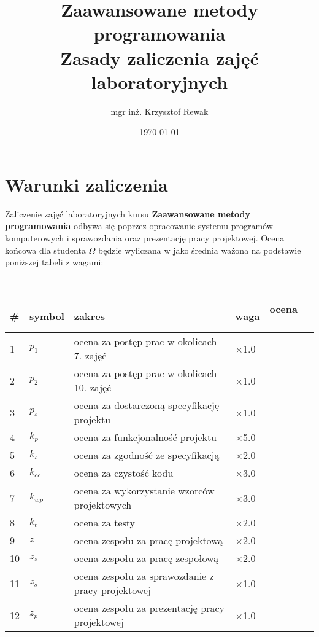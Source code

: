\documentclass{article}
\title{
	Zaawansowane metody programowania\\
	\Huge{Zasady zaliczenia zajęć laboratoryjnych}
}
\author{mgr inż. Krzysztof Rewak}
\date{\today}
\begin{document}
	\maketitle

	\section{Warunki zaliczenia}
	Zaliczenie zajęć laboratoryjnych kursu \textbf{Zaawansowane metody programowania} odbywa się poprzez opracowanie systemu programów komputerowych i sprawozdania oraz prezentację pracy projektowej. Ocena końcowa dla studenta $\Omega$ będzie wyliczana w jako średnia ważona na podstawie poniższej tabeli z wagami:
	
	\ \\
	
	\begin{tabularx}{.95\textwidth}{l|l|X|l|l}
		\textbf{\#} & \textbf{symbol} & \textbf{zakres} & \textbf{waga} & \textbf{ ocena \ \ \ } \\ \hline
		1 & $p_1$ & ocena za postęp prac w okolicach 7. zajęć & $\times$1.0 \\ \hline
		2 & $p_2$ & ocena za postęp prac w okolicach 10. zajęć & $\times$1.0 \\ \hline
		3 & $p_s$ & ocena za dostarczoną specyfikację projektu & $\times$1.0 \\ \hline
		4 & $k_{p}$ & ocena za funkcjonalność projektu & $\times$5.0 \\ \hline
		5 & $k_{s}$ & ocena za zgodność ze specyfikacją & $\times$2.0 \\ \hline
		6 & $k_{cc}$ & ocena za czystość kodu & $\times$3.0 \\ \hline
		7 & $k_{wp}$ & ocena za wykorzystanie wzorców projektowych & $\times$3.0 \\ \hline
		8 & $k_{t}$ & ocena za testy & $\times$2.0 \\ \hline
		9 & $z$ & ocena zespołu za pracę projektową & $\times$2.0 \\ \hline
		10 & $z_z$ & ocena zespołu za pracę zespołową & $\times$2.0 \\ \hline
		11 & $z_s$ & ocena zespołu za sprawozdanie z pracy projektowej & $\times$1.0 \\ \hline
		12 & $z_p$ & ocena zespołu za prezentację pracy projektowej & $\times$1.0 \\
	\end{tabularx}
	
	\ \\
	
\end{document}
